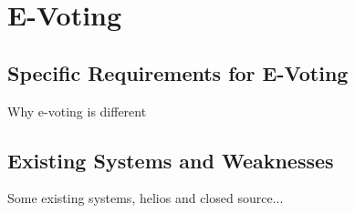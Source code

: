 
\chapter{E-Voting}
\label{ch:ev}

\section{Specific Requirements for E-Voting}
\label{ch:ev:specific}

Why e-voting is different

\section{Existing Systems and Weaknesses}
\label{ch:ev:existing}

Some existing systems, helios and closed source...
